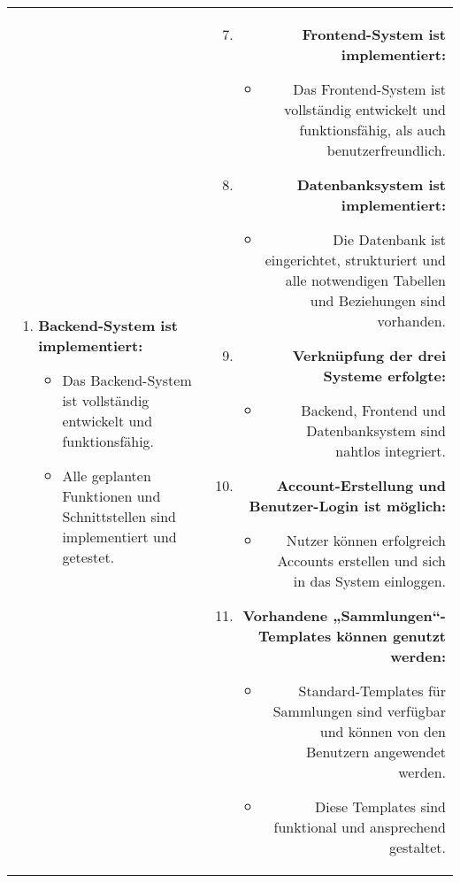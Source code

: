 \begin{tabularx}{\textwidth}{L R}
\begin{enumerate}[left=0pt,label=\arabic*.]
            \item \textbf{Backend-System ist implementiert:}
            \begin{itemize}[label=--]
                \item Das Backend-System ist vollständig entwickelt und funktionsfähig.
                \item Alle geplanten Funktionen und Schnittstellen sind implementiert und getestet.
            \end{itemize}



        \end{enumerate}
        &
        \begin{enumerate}[left=0pt,label=\arabic*.]
            \setcounter{enumi}{6}
            \small %
            \item \textbf{Frontend-System ist implementiert:}
            \begin{itemize}[label=--]
                \item Das Frontend-System ist vollständig entwickelt und funktionsfähig, als auch benutzerfreundlich.
            \end{itemize}
            \item \textbf{Datenbanksystem ist implementiert:}
            \begin{itemize}[label=--]
                \item Die Datenbank ist eingerichtet, strukturiert und alle notwendigen Tabellen und Beziehungen sind vorhanden.
            \end{itemize}

            \item \textbf{Verknüpfung der drei Systeme erfolgte:}
            \begin{itemize}[label=--]
                \item Backend, Frontend und Datenbanksystem sind nahtlos integriert.
            \end{itemize}

            \item \textbf{Account-Erstellung und Benutzer-Login ist möglich:}
            \begin{itemize}[label=--]
                \item Nutzer können erfolgreich Accounts erstellen und sich in das System einloggen.
            \end{itemize}

            \item \textbf{Vorhandene „Sammlungen“-Templates können genutzt werden:}
            \begin{itemize}[label=--]
                \item Standard-Templates für Sammlungen sind verfügbar und können von den Benutzern angewendet werden.
                \item Diese Templates sind funktional und ansprechend gestaltet.
            \end{itemize}


\end{enumerate}
\end{tabularx}
